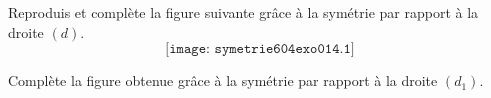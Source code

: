 \begin{myenumerate}
\item Reproduis et complète la figure suivante grâce à la symétrie par rapport à la droite $(d)$.
\[\texttt{[image: symetrie604exo014.1]}\]
\item Complète la figure obtenue grâce à la symétrie par rapport à la droite $(d_1)$.
\end{myenumerate}